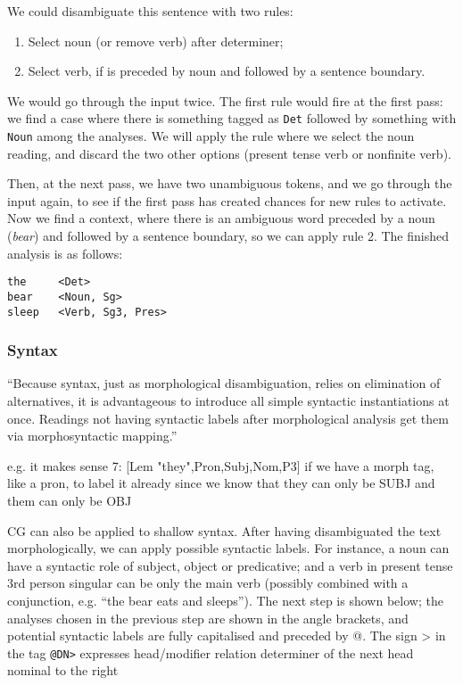 \documentclass[a4paper, 11pt]{article}
\begin{document}
We could disambiguate this sentence with two rules: 
\begin{enumerate}
\item Select noun (or remove verb) after determiner;
\item Select verb, if is preceded by noun and followed by a sentence boundary.
\end{enumerate}

We would go through the input twice. The first rule would fire at the
first pass: we find a case where there is something tagged as
\texttt{Det} followed by something with \texttt{Noun} among the
analyses. We will apply the rule where we select the noun reading, and
discard the two other options (present tense verb or nonfinite verb).

Then, at the next pass, we have two unambiguous tokens,
and we go through the input again, to see
if the first pass has created chances for new rules to
activate. Now we find a context, where there is an ambiguous word
preceded by a noun (\emph{bear}) and followed by a sentence boundary,
so we can apply rule 2. The finished analysis is as follows:

\begin{lstlisting}
the     <Det>
bear    <Noun, Sg>
sleep   <Verb, Sg3, Pres>
\end{lstlisting}

\subsubsection{Syntax}

``Because syntax, just as morphological disambiguation, relies on
elimination of alternatives, it is advantageous to introduce all
simple syntactic instantiations at once. Readings not having syntactic
labels after morphological analysis get them via morphosyntactic
mapping.''

e.g. it makes sense
7: [Lem "they",Pron,Subj,Nom,P3]
if we have a morph tag, like a pron, to label it already
since we know that they can only be SUBJ
and them can only be OBJ

CG can also be applied to shallow syntax. After having disambiguated
the text morphologically, we can apply possible syntactic labels. For
instance, a noun can have a syntactic role of subject, object or
predicative; and a verb in present tense 3rd person singular can be
only the main verb (possibly combined with a conjunction, e.g. ``the
bear eats and sleeps''). The next step is shown below; the analyses
chosen in the previous step are shown in the angle brackets, and potential
syntactic labels are fully capitalised and preceded by @. The sign >
in the tag \texttt{@DN>} expresses head/modifier relation determiner of the next head nominal to the right
\end{document}
